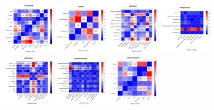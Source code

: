 \documentclass[12pt]{article}\usepackage[]{graphicx}\usepackage[]{color}
\begin{document}
\begin{figure}[p]
  \includegraphics[width = 0.24\textwidth]{./figure/allhmaps-8.pdf}
  \includegraphics[width = 0.24\textwidth]{./figure/allhmaps-9.pdf}
  \includegraphics[width = 0.24\textwidth]{./figure/allhmaps-10.pdf}
  \includegraphics[width = 0.24\textwidth]{./figure/allhmaps-11.pdf}
  \includegraphics[width = 0.24\textwidth]{./figure/allhmaps-12.pdf}
  \includegraphics[width = 0.24\textwidth]{./figure/allhmaps-13.pdf}
  \includegraphics[width = 0.24\textwidth]{./figure/allhmaps-14.pdf}

\end{figure}
\end{document}
